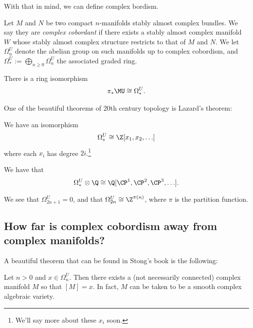 \documentclass[11pt]{book}
\begin{document}
With that in mind, we can define complex bordism.

\begin{definition}\label{def:complex-cobordism} Let $M$ and $N$ be two compact $n$-manifolds stably almost complex bundles. We say they are \emph{complex cobordant} if there exists a stably almost complex manifold $W$ whose stably almost complex structure restricts to that of $M$ and $N$. We let $\Omega_{n}^U$ denote the abelian group on such manifolds up to complex cobordism, and $\Omega_\ast^U := \bigoplus_{n\ge0} \Omega_n^U$ the associated graded ring.
\end{definition}

\begin{theorem} There is a ring isomorphism
\begin{align*}
    \pi_\ast\MU \cong \Omega_\ast^U.
\end{align*}
\end{theorem}

One of the beautiful theorems of 20th century topology is Lazard's theorem:

\begin{theorem} We have an isomorphism
\begin{align*}
    \Omega^U_\ast \cong \Z[x_1,x_2, \ldots]
\end{align*}
where each $x_i$ has degree $2i$.\footnote{We'll say more about these $x_i$ soon.}
\end{theorem}

\begin{theorem} We have that
\begin{align*}
    \Omega_\ast^U \otimes\Q \cong \Q[\CP^1, \CP^2, \CP^3, \ldots].
\end{align*}
\end{theorem}


\begin{corollary} We see that $\Omega^U_{2n+1}= 0$, and that $\Omega_{2n}^U \cong \Z^{\pi(n)}$, where $\pi$ is the partition function.
\end{corollary}

\subsection{How far is complex cobordism away from complex manifolds?}

A beautiful theorem that can be found in Stong's book is the following:

\begin{theorem} Let $n>0$ and $x\in \Omega_n^U$. Then there exists a (not necessarily connected) complex manifold $M$ so that $[M]=x$. In fact, $M$ can be taken to be a smooth complex algebraic variety.
\end{theorem}
\end{document}
